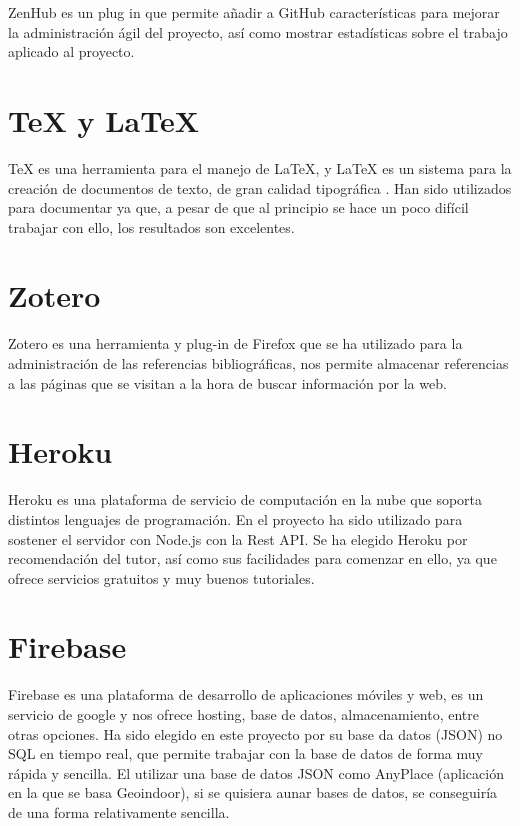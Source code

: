 ZenHub es un plug in que permite añadir a GitHub características para mejorar la administración ágil del proyecto, así como mostrar estadísticas sobre el trabajo aplicado al proyecto.



\section{\TeX{} y \LaTeX}\label{Latex}

\TeX{} es una herramienta para el manejo de \LaTeX{}, y \LaTeX{} es un sistema para la creación de documentos de texto, de gran calidad tipográfica \cite{latexbib} \cite{texbib}.
Han sido utilizados para documentar ya que, a pesar de que al principio se hace un poco difícil trabajar con ello, los resultados son excelentes.

\section{Zotero}\label{zotero}

Zotero es una herramienta y plug-in de Firefox que se ha utilizado para la administración de las referencias bibliográficas, nos permite almacenar referencias a las páginas que se visitan a la hora de buscar información por la web. 

\section{Heroku}\label{heroku}

Heroku es una plataforma de servicio de computación en la nube que soporta distintos lenguajes de programación.
En el proyecto ha sido utilizado para sostener el servidor con Node.js con la Rest API. Se ha elegido Heroku por recomendación del tutor, así como sus facilidades para comenzar en ello, ya que ofrece servicios gratuitos y muy buenos tutoriales.

\section{Firebase}\label{firebase}

Firebase es una plataforma de desarrollo de aplicaciones móviles y web, es un servicio de google y nos ofrece hosting, base de datos, almacenamiento, entre otras opciones. Ha sido elegido en este proyecto por su base da datos (JSON) no SQL en tiempo real, que permite trabajar con la base de datos de forma muy rápida y sencilla. El utilizar una base de datos JSON como AnyPlace (aplicación en la que se basa Geoindoor), si se quisiera aunar bases de datos, se conseguiría de una forma relativamente sencilla.


